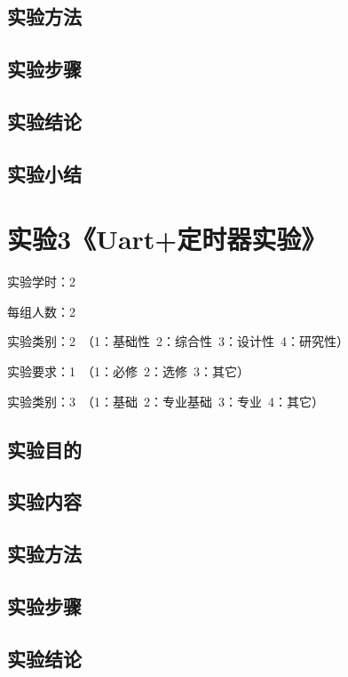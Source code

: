 ﻿\documentclass[UTF8,12pt]{article}
\begin{document}
\subsection{实验方法}

\subsection{实验步骤}

\subsection{实验结论}

\subsection{实验小结}

\newpage

\section{实验3《Uart+定时器实验》}

实验学时：2

每组人数：2

实验类别：2\ （1：基础性\ 2：综合性\ 3：设计性\ 4：研究性）

实验要求：1\ （1：必修\ 2：选修\ 3：其它）

实验类别：3\ （1：基础\ 2：专业基础\ 3：专业\ 4：其它）

\subsection{实验目的}

\subsection{实验内容}

\subsection{实验方法}

\subsection{实验步骤}

\subsection{实验结论}
\end{document}
